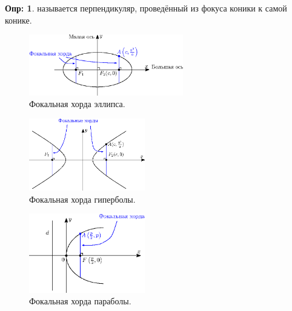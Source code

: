 \documentclass[12pt]{article}
\theoremstyle{definition}
\newtheorem{defn}{Опр:}
\begin{document}
\begin{defn}
	 называется перпендикуляр, проведённый из фокуса коники к самой конике.
\end{defn}
\begin{figure}[H]
	\centering
	\includegraphics[width=0.6\textwidth]{ANGL3_7.eps}
	\caption{Фокальная хорда эллипса.}
	\label{3_7}
\end{figure}
\begin{figure}[H]
	\centering
	\includegraphics[width=0.45\textwidth]{ANGL3_8.eps}
	\caption{Фокальная хорда гиперболы.}
	\label{3_8}
\end{figure}
\begin{figure}[H]
	\centering
	\includegraphics[width=0.45\textwidth]{ANGL3_9.eps}
	\caption{Фокальная хорда параболы.}
	\label{3_9}
\end{figure}
\end{document}
